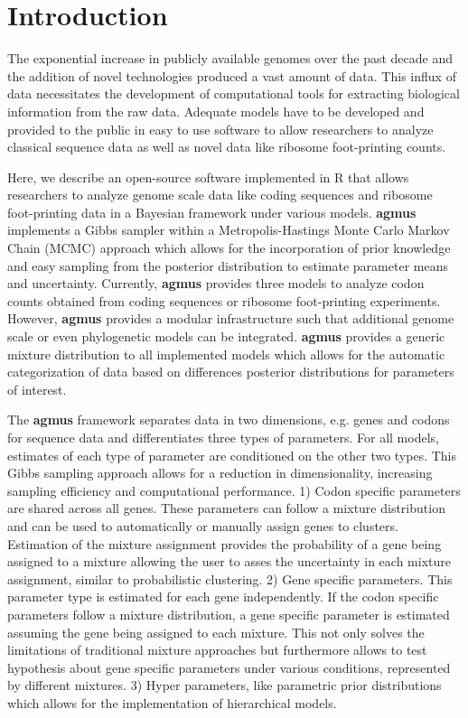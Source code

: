 \documentclass{bioinfo}
\newcommand{\package}{\textbf{agmus }} %
\begin{document}
\section*{Introduction}
The exponential increase in publicly available genomes over the past decade and the addition of novel technologies produced a vast amount of data.  
This influx of data necessitates the development of computational tools for extracting biological information from the raw data. 
Adequate models have to be developed and provided to the public in easy to use software to allow researchers to analyze classical sequence data as well as novel data like ribosome foot-printing counts.

Here, we describe an open-source software implemented in R \citep{rcore} that allows researchers to analyze genome scale data like coding sequences and ribosome foot-printing data in a Bayesian framework under various models. 
\package implements a Gibbs sampler within a Metropolis-Hastings Monte Carlo Markov Chain (MCMC) approach which allows for the incorporation of prior knowledge and easy sampling from the posterior distribution to estimate parameter means and uncertainty.
Currently, \package provides three models to analyze codon counts obtained from coding sequences or ribosome foot-printing experiments. However, \package provides a modular infrastructure such that additional genome scale or even phylogenetic models can be integrated. 
\package provides a generic mixture distribution to all implemented models which allows for the automatic categorization of data based on differences posterior distributions for parameters of interest.

The \package framework separates data in two dimensions, e.g. genes and codons for sequence data and differentiates three types of parameters.
For all models, estimates of each type of parameter are conditioned on the other two types. 
This Gibbs sampling approach allows for a reduction in dimensionality, increasing sampling efficiency and computational performance.
1) Codon specific parameters are shared across all genes. These parameters can follow a mixture distribution and can be used to automatically or manually assign genes to clusters.
Estimation of the mixture assignment provides the probability of a gene being assigned to a mixture allowing the user to asses the uncertainty in each mixture assignment, similar to probabilistic clustering.
2) Gene specific parameters. This parameter type is estimated for each gene independently. If the codon specific parameters follow a mixture distribution, a gene specific parameter is estimated assuming the gene being assigned to each mixture. This not only solves the limitations of traditional mixture approaches but furthermore allows to test hypothesis about gene specific parameters under various conditions, represented by different mixtures.
3) Hyper parameters, like parametric prior distributions which allows for the implementation of hierarchical models.
\end{document}
